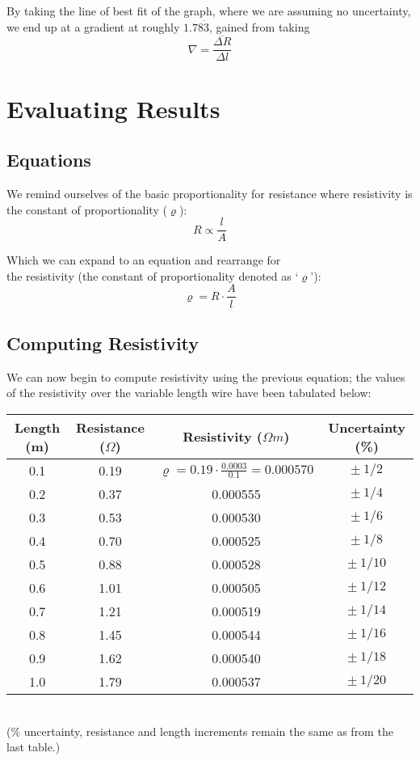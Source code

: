 \documentclass{article}
\begin{document}
By taking the line of best fit of the graph, where we are assuming no uncertainty, we end up at a gradient at roughly $1.78\dot{3}$, gained from taking 
\[ \nabla = \frac{\overline{\Delta R}}{\Delta l} \]

\section[Evaluation]{Evaluating Results}
\subsection{Equations}
We remind ourselves of the basic proportionality for resistance where resistivity is the constant of proportionality ($\varrho$):
\[ R \propto \frac{l}{A} \]
\begin{center}{Which we can expand to an equation and rearrange for
\\the resistivity (the constant of proportionality denoted as `$\varrho$'):}
\[ \varrho = R \cdot \frac{A}{l} \]
\end{center}
\clearpage

\subsection{Computing Resistivity}
We can now begin to compute resistivity using the previous equation; the values of the resistivity over the variable length wire have been tabulated below:
\begin{center}
\begin{tabular}{ |c|c|c|c| }
 \hline
 Length (m) & Resistance ($\Omega$) & Resistivity ($\Omega m$) & Uncertainty (\%) \\
 \hline
 0.1 & 0.19 & $\varrho = 0.19 \cdot \frac{0.0003}{0.1} = 0.000570$ & $\pm\ 1/2$ \\ 
 0.2 & 0.37 & 0.000555 & $\pm\ 1/4$ \\  
 0.3 & 0.53 & 0.000530 & $\pm\ 1/6$ \\
 0.4 & 0.70 & 0.000525 & $\pm\ 1/8$ \\
 0.5 & 0.88 & 0.000528 & $\pm\ 1/10$ \\
 0.6 & 1.01 & 0.000505 & $\pm\ 1/12$ \\
 0.7 & 1.21 & 0.000519 & $\pm\ 1/14$ \\
 0.8 & 1.45 & 0.000544 & $\pm\ 1/16$ \\
 0.9 & 1.62 & 0.000540 & $\pm\ 1/18$ \\
 1.0 & 1.79 & 0.000537 & $\pm\ 1/20$ \\
\hline
\end{tabular}
\\ \vspace{2mm}
($\%$ uncertainty, resistance and length increments remain the same as from the last table.)
\\ \vspace{5mm}

\end{center}
\end{document}
